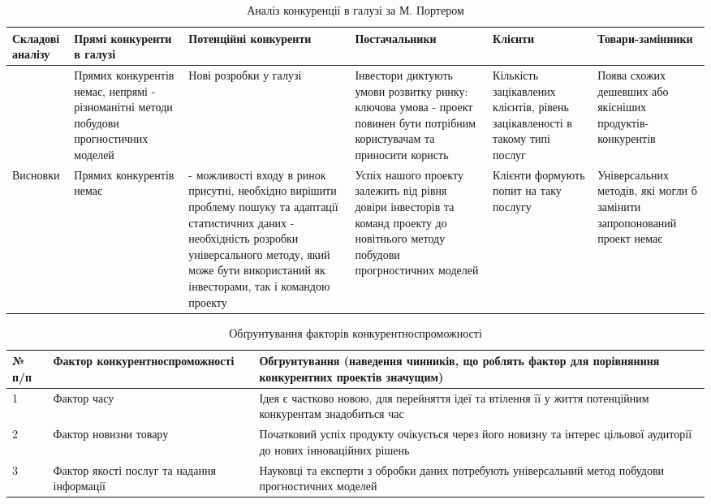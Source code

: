 \begin{table}
	\begin{tabularx}{\textwidth}{|X|X|X|X|X|X|}
    \hline
    Складові аналізу & Прямі конкуренти в галузі & Потенційні конкуренти & Постачальники & Клієнти & Товари-замінники \\ \hline
     & Прямих конкурентів немає, непрямі - різноманітні методи побудови прогностичних моделей & Нові розробки у галузі & Інвестори диктують умови розвитку ринку: ключова умова - проект повинен бути потрібним користувачам та приносити користь & Кількість зацікавлених клієнтів, рівень зацікавленості в такому типі послуг & Поява схожих дешевших або якісніших продуктів-конкурентів \\ \hline
    Висновки & Прямих конкурентів немає & - можливості входу в ринок присутні, необхідно вирішити проблему пошуку та адаптації статистичних даних - необхідність розробки універсального методу, який може бути використаний як інвесторами, так і командою проекту & Успіх нашого проекту залежить від рівня довіри інвесторів та команд проекту до новітнього методу побудови прогрностичних моделей & Клієнти формують попит на таку послугу & Універсальних методів, які могли б замінити запропонований проект немає \\
    \hline
    \end{tabularx}
\caption{Аналіз конкуренції в галузі за М. Портером} \label{tab:sometab}
\end{table}

\begin{table}
	\begin{tabularx}{\textwidth}{|l|X|X|}
    \hline
    № п/п & Фактор конкурентноспроможності & Обгрунтування (наведення чинників, що роблять фактор для порівнянння конкурентних проектів значущим) \\ \hline
    1 & Фактор часу & Ідея є частково новою, для перейняття ідеї та втілення її у життя потенційним конкурентам знадобиться час \\ \hline
    2 & Фактор новизни товару & Початковий успіх продукту очікується через його новизну та інтерес цільової аудиторії до нових інноваційних рішень \\ \hline
    3 & Фактор якості послуг та надання інформації & Науковці та експерти з обробки даних потребують універсальний метод побудови прогностичних моделей \\
    \hline
    \end{tabularx}
\caption{Обґрунтування факторів конкурентноспроможності} \label{tab:sometab}
\end{table}

